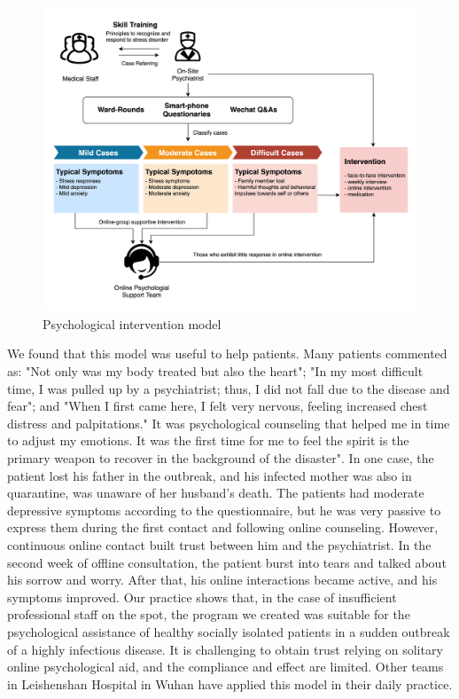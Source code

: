 \documentclass[
]{article}
\begin{document}
\begin{figure}
\centering
\includegraphics{fig_patient_workflow.jpg}
\caption{Psychological intervention model}
\end{figure}

We found that this model was useful to help patients. Many patients commented as: "Not only was my body treated but also the heart"; "In my most difficult time, I was pulled up by a psychiatrist; thus, I did not fall due to the disease and fear"; and "When I first came here, I felt very nervous, feeling increased chest distress and palpitations." It was psychological counseling that helped me in time to adjust my emotions. It was the first time for me to feel the spirit is the primary weapon to recover in the background of the disaster". In one case, the patient lost his father in the outbreak, and his infected mother was also in quarantine, was unaware of her husband's death. The patients had moderate depressive symptoms according to the questionnaire, but he was very passive to express them during the first contact and following online counseling. However, continuous online contact built trust between him and the psychiatrist. In the second week of offline consultation, the patient burst into tears and talked about his sorrow and worry. After that, his online interactions became active, and his symptoms improved. Our practice shows that, in the case of insufficient professional staff on the spot, the program we created was suitable for the psychological assistance of healthy socially isolated patients in a sudden outbreak of a highly infectious disease. It is challenging to obtain trust relying on solitary online psychological aid, and the compliance and effect are limited. Other teams in Leishenshan Hospital in Wuhan have applied this model in their daily practice.
\end{document}
